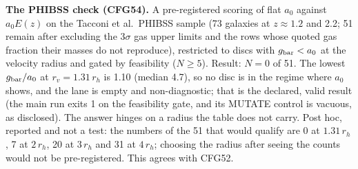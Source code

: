 \documentclass[10pt]{article}
\begin{document}
\textbf{The PHIBSS check (CFG54).} A pre-registered scoring of flat $a_0$ against $a_0E(z)$ on the Tacconi et al.\ PHIBSS sample (73 galaxies at $z\approx1.2$ and 2.2; 51 remain after excluding the 3$\sigma$ gas upper limits and the rows whose quoted gas fraction their masses do not reproduce), restricted to discs with $g_{\rm bar}<a_0$ at the velocity radius and gated by feasibility ($N\ge5$). Result: $N=0$ of 51. The lowest $g_{\rm bar}/a_0$ at $r_v=1.31\,r_h$ is 1.10 (median 4.7), so no disc is in the regime where $a_0$ shows, and the lane is empty and non-diagnostic; that is the declared, valid result (the main run exits 1 on the feasibility gate, and its MUTATE control is vacuous, as disclosed). The answer hinges on a radius the table does not carry. Post hoc, reported and not a test: the numbers of the 51 that would qualify are 0 at $1.31\,r_h$, 7 at $2\,r_h$, 20 at $3\,r_h$ and 31 at $4\,r_h$; choosing the radius after seeing the counts would not be pre-registered. This agrees with CFG52.
\end{document}
